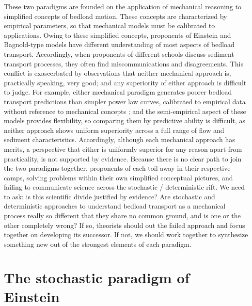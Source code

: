 \documentclass{article}
\begin{document}
These two paradigms are founded on the application of mechanical reasoning to simplified concepts of bedload motion.
These concepts are characterized by empirical parameters, so that mechanical models must be calibrated to applications. 
Owing to these simplified concepts, proponents of Einstein and Bagnold-type models have different understanding of most aspects of bedload transport.
Accordingly, when proponents of different schools discuss sediment transport processes, they often find miscommunications and disagreements. 
This conflict is exascerbated by observations that neither mechanical approach is, practically speaking, very good; and any superiority of either approach is difficult to judge. 
For example, either mechanical paradigm generates poorer bedload transport predictions than simpler power law curves, calibrated to empirical data without reference to mechanical concepts \citep{Barry2004}; and the semi-empirical aspect of these models provides flexibility, so comparing them by predictive ability is difficult, as neither approach shows uniform superiority across a full range of flow and sediment characteristics. 
Accordingly, although each mechanical approach has merits, a perspective that either is uniformly superior for any reason apart from practicality, is not supported by evidence.  
Because there is no clear path to join the two paradigms together, proponents of each toil away in their respective camps, solving problems within their own simplified conceptual pictures, and failing to communicate science across the stochastic / deterministic rift. 
We need to ask: is this scientific divide justified by evidence? 
Are stochastic and deterministic approaches to understand bedload transport as a mechanical process really so different that they share no common ground, and is one or the other completely wrong? 
If so, theorists should out the failed approach and focus together on developing its successor. 
If not, we should work together to synthesize something new out of the strongest elements of each paradigm. 

\section{The stochastic paradigm of Einstein}
\end{document}

